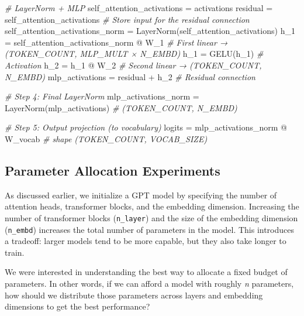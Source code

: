 \documentclass[11pt]{article}
\newenvironment{Shaded}{}{}
\newcommand{\CommentTok}[1]{\textcolor[rgb]{0.38,0.63,0.69}{\textit{{#1}}}}
\newcommand{\NormalTok}[1]{{#1}}
\newcommand{\OperatorTok}[1]{\textcolor[rgb]{0.40,0.40,0.40}{{#1}}}
\begin{document}
\begin{Shaded}
\begin{Highlighting}[]
    \CommentTok{\# LayerNorm + MLP}
\NormalTok{    self\_attention\_activations }\OperatorTok{=}\NormalTok{ activations}
\NormalTok{    residual }\OperatorTok{=}\NormalTok{ self\_attention\_activations       }\CommentTok{\# Store input for the residual connection}
\NormalTok{    self\_attention\_activations\_norm }\OperatorTok{=}\NormalTok{ LayerNorm(self\_attention\_activations)}
\NormalTok{    h\_1 }\OperatorTok{=}\NormalTok{ self\_attention\_activations\_norm }\OperatorTok{@}\NormalTok{ W\_1  }
                                        \CommentTok{\# First linear → (TOKEN\_COUNT, MLP\_MULT × N\_EMBD)}
\NormalTok{    h\_1 }\OperatorTok{=}\NormalTok{ GELU(h\_1)                              }\CommentTok{\# Activation}
\NormalTok{    h\_2 }\OperatorTok{=}\NormalTok{ h\_1 }\OperatorTok{@}\NormalTok{ W\_2                              }\CommentTok{\# Second linear → (TOKEN\_COUNT, N\_EMBD)}
\NormalTok{    mlp\_activations }\OperatorTok{=}\NormalTok{ residual }\OperatorTok{+}\NormalTok{ h\_2             }\CommentTok{\# Residual connection}

\CommentTok{\# Step 4: Final LayerNorm}
\NormalTok{mlp\_activations\_norm }\OperatorTok{=}\NormalTok{ LayerNorm(mlp\_activations)       }\CommentTok{\# (TOKEN\_COUNT, N\_EMBD)}

\CommentTok{\# Step 5: Output projection (to vocabulary)}
\NormalTok{logits }\OperatorTok{=}\NormalTok{ mlp\_activations\_norm }\OperatorTok{@}\NormalTok{ W\_vocab                 }\CommentTok{\# shape (TOKEN\_COUNT, VOCAB\_SIZE)}
\end{Highlighting}
\end{Shaded}

    \subsection{Parameter Allocation
Experiments}\label{parameter-allocation-experiments}

As discussed earlier, we initialize a GPT model by specifying the number
of attention heads, transformer blocks, and the embedding dimension.
Increasing the number of transformer blocks (\texttt{n\_layer}) and the
size of the embedding dimension (\texttt{n\_embd}) increases the total
number of parameters in the model. This introduces a tradeoff: larger
models tend to be more capable, but they also take longer to train.

We were interested in understanding the best way to allocate a fixed
budget of parameters. In other words, if we can afford a model with
roughly \emph{n} parameters, how should we distribute those parameters
across layers and embedding dimensions to get the best performance?
\end{document}
